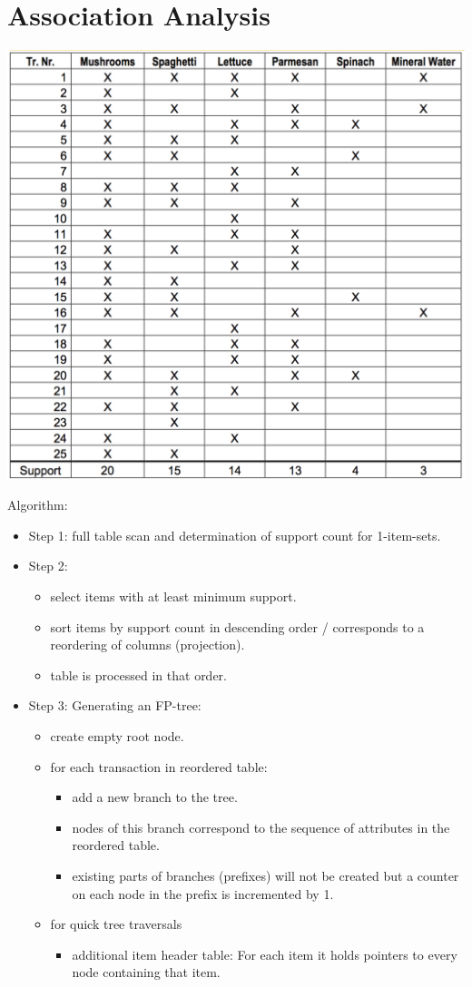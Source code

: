 
\section{Association Analysis}

\begin{breakbox}
\begin{center}
\includegraphics[width=.15\textwidth]{slides_images/fp_growth_data}
\end{center}
Algorithm:
\begin{itemize}
	\item Step 1: full table scan and determination of support count for 1-item-sets.
	\item Step 2:
		\begin{itemize}
			\item select items with at least minimum support.
			\item sort items by support count in descending order / corresponds to a reordering of columns (projection).
			\item table is processed in that order.
		\end{itemize}
	\item Step 3: Generating an FP-tree:
		\begin{itemize}
			\item create empty root node.
			\item for each transaction in reordered table:
				\begin{itemize}
					\item add a new branch to the tree.
					\item nodes of this branch correspond to the sequence of attributes in the reordered table.
					\item existing parts of branches (prefixes) will not be created but a counter on each node in the prefix is incremented by 1.
				\end{itemize}
			\item for quick tree traversals
				\begin{itemize}
					\item additional item header table: For each item it holds pointers to every node containing that item.
				\end{itemize}
		\end{itemize}

\end{itemize}
\end{breakbox}
